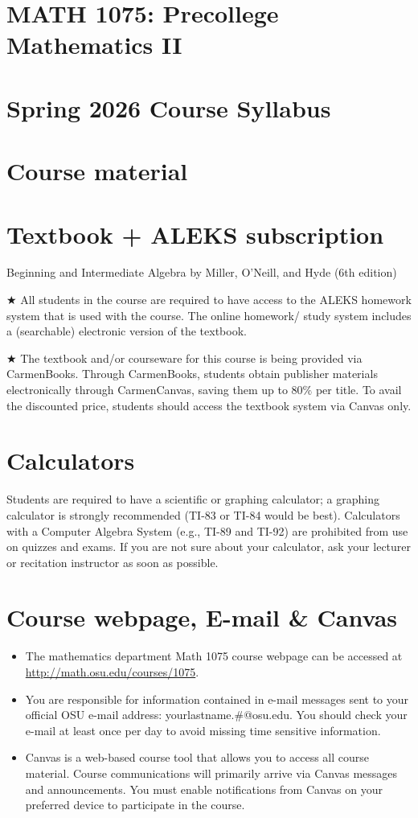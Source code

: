 \documentclass{ximera}
\begin{document}
\section*{MATH 1075: Precollege Mathematics II}
\section*{Spring 2026 Course Syllabus}
\section*{Course material}
\section*{Textbook + ALEKS subscription}
Beginning and Intermediate Algebra by Miller, O'Neill, and Hyde (6th edition)

★ All students in the course are required to have access to the ALEKS homework system that is used with the course. The online homework/ study system includes a (searchable) electronic version of the textbook.

★ The textbook and/or courseware for this course is being provided via CarmenBooks. Through CarmenBooks, students obtain publisher materials electronically through CarmenCanvas, saving them up to $80 \%$ per title. To avail the discounted price, students should access the textbook system via Canvas only.

\section*{Calculators}
Students are required to have a scientific or graphing calculator; a graphing calculator is strongly recommended (TI-83 or TI-84 would be best). Calculators with a Computer Algebra System (e.g., TI-89 and TI-92) are prohibited from use on quizzes and exams. If you are not sure about your calculator, ask your lecturer or recitation instructor as soon as possible.

\section*{Course webpage, E-mail \& Canvas}
\begin{itemize}
  \item The mathematics department Math 1075 course webpage can be accessed at \href{http://math.osu.edu/courses/1075}{http://math.osu.edu/courses/1075}.
  \item You are responsible for information contained in e-mail messages sent to your official OSU e-mail address: yourlastname.\#@osu.edu. You should check your e-mail at least once per day to avoid missing time sensitive information.
  \item Canvas is a web-based course tool that allows you to access all course material. Course communications will primarily arrive via Canvas messages and announcements. You must enable notifications from Canvas on your preferred device to participate in the course.
\end{itemize}
\end{document}
